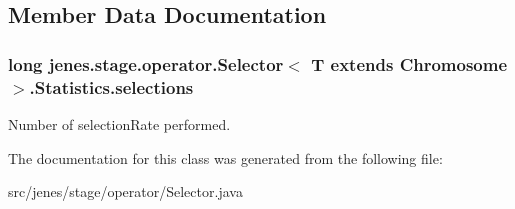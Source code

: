 \subsection{Member Data Documentation}
\hypertarget{classjenes_1_1stage_1_1operator_1_1_selector_3_01_t_01extends_01_chromosome_01_4_1_1_statistics_8308f3f0177bfe79fcbf46bd4ac93cc4}{
\subsubsection[selections]{\setlength{\rightskip}{0pt plus 5cm}long jenes.stage.operator.Selector$<$ T extends Chromosome $>$.Statistics.selections}}
\label{classjenes_1_1stage_1_1operator_1_1_selector_3_01_t_01extends_01_chromosome_01_4_1_1_statistics_8308f3f0177bfe79fcbf46bd4ac93cc4}


Number of selectionRate performed. 

The documentation for this class was generated from the following file:\begin{CompactItemize}
\item 
src/jenes/stage/operator/Selector.java\end{CompactItemize}
